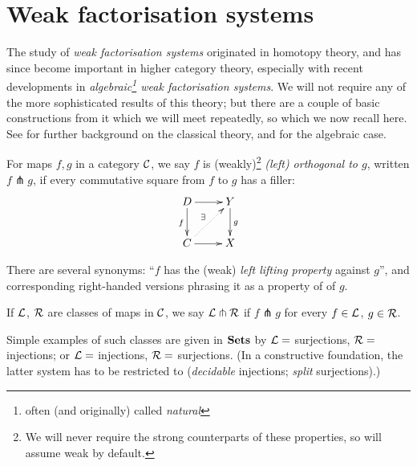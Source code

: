 \section{Weak factorisation systems} \label{sec:wfs-bgd}

The study of \emph{weak factorisation systems} originated in homotopy theory, and has since become important in higher category theory, especially with recent developments in \emph{algebraic\footnote{often (and originally) called \emph{natural}} weak factorisation systems}.  We will not require any of the more sophisticated results of this theory; but there are a couple of basic constructions from it which we will meet repeatedly, so which we now recall here.  See \cite[Ch.~1]{hovey:book} for further background on the classical theory, and \cite{garner:understanding} for the algebraic case.

\begin{definition}For maps $f, g$ in a category $\mathcal{C}$, we say $f$ is (weakly)\footnote{We will never require the strong counterparts of these properties, so will assume weak by default.} \emph{(left) orthogonal to $g$}, written \emph{$f \pitchfork g$}, if every commutative square from $f$ to $g$ has a filler:
\[\xymatrix{D \ar[r] \ar[d]_f & Y \ar[d]^g \\ C \ar[r] \ar@{..>}[ur]^\exists & X}\]

There are several synonyms: ``$f$ has the (weak) \emph{left lifting property} against $g$'', and corresponding right-handed versions phrasing it as a property of of $g$. 

If $\mathcal{L}$, $\mathcal{R}$ are classes of maps in $\mathcal{C}$, we say $\mathcal{L} \pitchfork \mathcal{R}$ if $f \pitchfork g$ for every $f \in \mathcal{L}$, $g \in \mathcal{R}$.
\end{definition}

Simple examples of such classes are given in $\mathbf{Sets}$ by $\mathcal{L} =$ surjections, $\mathcal{R} =$ injections; or $\mathcal{L} =$ injections, $\mathcal{R} = $ surjections.  (In a constructive foundation, the latter system has to be restricted to (\emph{decidable} injections; \emph{split} surjections).)

